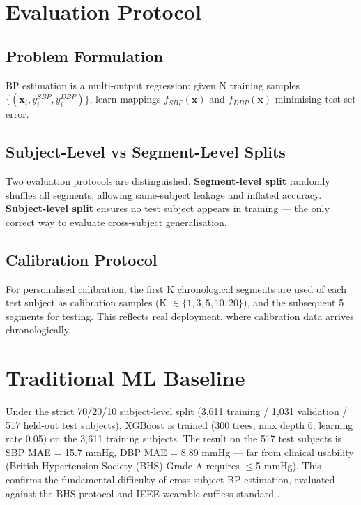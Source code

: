 \section{Evaluation Protocol}

\subsection{Problem Formulation}

BP estimation is a multi-output regression: given N training samples $\{(\mathbf{x}_i, y_i^{SBP}, y_i^{DBP})\}$, learn mappings $f_{SBP}(\mathbf{x})$ and $f_{DBP}(\mathbf{x})$ minimising test-set error.

\subsection{Subject-Level vs Segment-Level Splits}

Two evaluation protocols are distinguished. \textbf{Segment-level split} randomly shuffles all segments, allowing same-subject leakage and inflated accuracy. \textbf{Subject-level split} ensures no test subject appears in training --- the only correct way to evaluate cross-subject generalisation.

\subsection{Calibration Protocol}

For personalised calibration, the first K chronological segments are used of each test subject as calibration samples (K $\in \{1,3,5,10,20\}$), and the subsequent 5 segments for testing. This reflects real deployment, where calibration data arrives chronologically.

\section{Traditional ML Baseline}

Under the strict 70/20/10 subject-level split (3,611 training / 1,031 validation / 517 held-out test subjects), XGBoost is trained \citep{chen2016xgboost} (300 trees, max depth 6, learning rate 0.05) on the 3,611 training subjects. The result on the 517 test subjects is SBP MAE = 15.7 mmHg, DBP MAE = 8.89 mmHg --- far from clinical usability (British Hypertension Society (BHS) Grade A requires $\leq$5 mmHg). This confirms the fundamental difficulty of cross-subject BP estimation, evaluated against the BHS protocol \citep{bhs1993} and IEEE wearable cuffless standard \citep{ieee1708}.

